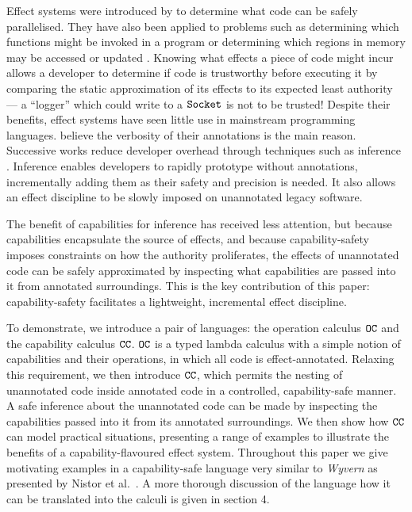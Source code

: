 Effect systems were introduced by \citet{lucassen88} to determine what code can be safely parallelised. They have also been applied to problems such as determining which functions might be invoked in a program \cite{tang94} or determining which regions in memory may be accessed or updated \cite{talpin94}. Knowing what effects a piece of code might incur allows a developer to determine if code is trustworthy before executing it by comparing the static approximation of its effects to its expected least authority --- a ``logger'' which could write to a $\mathtt{Socket}$ is not to be trusted! Despite their benefits, effect systems have seen little use in mainstream programming languages. \citet{rytz12} believe the verbosity of their annotations is the main reason. Successive works reduce developer overhead through techniques such as inference \cite{koka14}. Inference enables developers to rapidly prototype without annotations, incrementally adding them as their safety and precision is needed. It also allows an effect discipline to be slowly imposed on unannotated legacy software.

The benefit of capabilities for inference has received less attention, but because capabilities encapsulate the source of effects, and because capability-safety imposes constraints on how the authority proliferates, the effects of unannotated code can be safely approximated by inspecting what capabilities are passed into it from annotated surroundings. This is the key contribution of this paper: capability-safety facilitates a lightweight, incremental effect discipline.

To demonstrate, we introduce a pair of languages: the operation calculus $\mathtt{OC}$ and the capability calculus $\mathtt{CC}$. $\mathtt{OC}$ is a typed lambda calculus with a simple notion of capabilities and their operations, in which all code is effect-annotated. Relaxing this requirement, we then introduce $\mathtt{CC}$, which permits the nesting of unannotated code inside annotated code in a controlled, capability-safe manner. A safe inference about the unannotated code can be made by inspecting the capabilities passed into it from its annotated surroundings. We then show how $\mathtt{CC}$ can model practical situations, presenting a range of examples to illustrate the benefits of a capability-flavoured effect system. Throughout this paper we give motivating examples in a capability-safe language very similar to \textit{Wyvern} as presented by Nistor et al.~\cite{nistor13}. A more thorough discussion of the language how it can be translated into the calculi is given in section 4.
